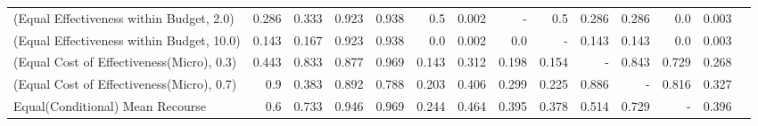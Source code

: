 \documentclass{article}
\begin{document}
\begin{table}[ht]
{\begin{tabular}{lrrrrrrrrrrrrr}
(Equal Effectiveness within Budget, 2.0)   &                                     0.286 &                                     0.333 &                            0.923 &                            0.938 &                 0.5 &                                    0.002 &                                        - &                                       0.5 &                                     0.286 &                                     0.286 &                              0.0 &                                      0.003 \\
(Equal Effectiveness within Budget, 10.0)  &                                     0.143 &                                     0.167 &                            0.923 &                            0.938 &                 0.0 &                                    0.002 &                                      0.0 &                                         - &                                     0.143 &                                     0.143 &                              0.0 &                                      0.003 \\
(Equal Cost of Effectiveness(Micro), 0.3)  &                                     0.443 &                                     0.833 &                            0.877 &                            0.969 &               0.143 &                                    0.312 &                                    0.198 &                                     0.154 &                                         - &                                     0.843 &                            0.729 &                                      0.268 \\
(Equal Cost of Effectiveness(Micro), 0.7)  &                                       0.9 &                                     0.383 &                            0.892 &                            0.788 &               0.203 &                                    0.406 &                                    0.299 &                                     0.225 &                                     0.886 &                                         - &                            0.816 &                                      0.327 \\
Equal(Conditional) Mean Recourse           &                                       0.6 &                                     0.733 &                            0.946 &                            0.969 &               0.244 &                                    0.464 &                                    0.395 &                                     0.378 &                                     0.514 &                                     0.729 &                                - &                                      0.396 \\

\end{tabular}}
\end{table}
\end{document}
